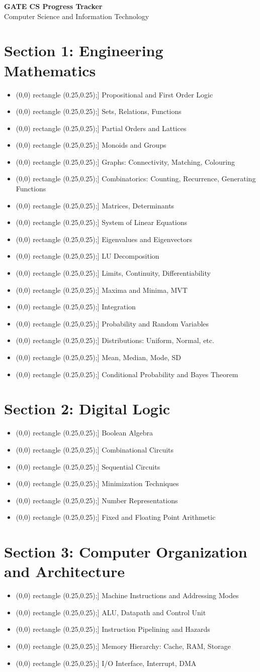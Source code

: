 \documentclass[14pt]{extarticle}
\newcommand{\checkbox}{\tikz\draw[thick] (0,0) rectangle (0.25,0.25);}
\newcommand{\topicitem}[1]{\item[\checkbox] #1}
\begin{document}
\begin{center}
    {\LARGE \textbf{GATE CS Progress Tracker}} \\
    \vspace{0.5em}
    {\large Computer Science and Information Technology}
\end{center}

\section*{Section 1: Engineering Mathematics}
\begin{itemize}[leftmargin=1.5cm]
  \topicitem{Propositional and First Order Logic}
  \topicitem{Sets, Relations, Functions}
  \topicitem{Partial Orders and Lattices}
  \topicitem{Monoids and Groups}
  \topicitem{Graphs: Connectivity, Matching, Colouring}
  \topicitem{Combinatorics: Counting, Recurrence, Generating Functions}
  \topicitem{Matrices, Determinants}
  \topicitem{System of Linear Equations}
  \topicitem{Eigenvalues and Eigenvectors}
  \topicitem{LU Decomposition}
  \topicitem{Limits, Continuity, Differentiability}
  \topicitem{Maxima and Minima, MVT}
  \topicitem{Integration}
  \topicitem{Probability and Random Variables}
  \topicitem{Distributions: Uniform, Normal, etc.}
  \topicitem{Mean, Median, Mode, SD}
  \topicitem{Conditional Probability and Bayes Theorem}
\end{itemize}

\section*{Section 2: Digital Logic}
\begin{itemize}[leftmargin=1.5cm]
  \topicitem{Boolean Algebra}
  \topicitem{Combinational Circuits}
  \topicitem{Sequential Circuits}
  \topicitem{Minimization Techniques}
  \topicitem{Number Representations}
  \topicitem{Fixed and Floating Point Arithmetic}
\end{itemize}

\section*{Section 3: Computer Organization and Architecture}
\begin{itemize}[leftmargin=1.5cm]
  \topicitem{Machine Instructions and Addressing Modes}
  \topicitem{ALU, Datapath and Control Unit}
  \topicitem{Instruction Pipelining and Hazards}
  \topicitem{Memory Hierarchy: Cache, RAM, Storage}
  \topicitem{I/O Interface, Interrupt, DMA}
\end{itemize}
\end{document}

